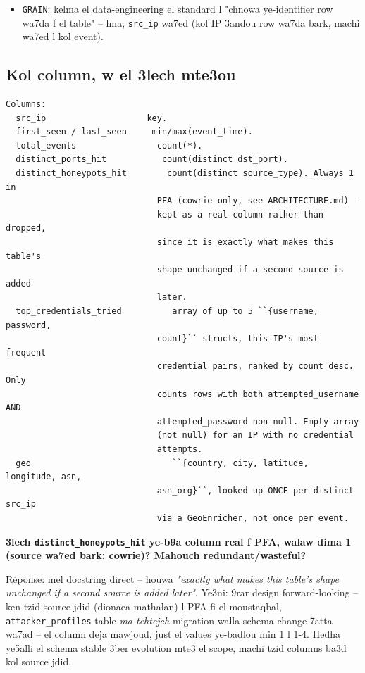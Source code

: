 \documentclass[11pt,a4paper]{report}
\DeclareRobustCommand{\code}[1]{\texttt{#1}}
\begin{document}
\begin{itemize}
  \item \code{GRAIN}: kelma el data-engineering el standard l "chnowa
        ye-identifier row wa7da f el table" -- hna, \code{src\_ip} wa7ed
        (kol IP 3andou row wa7da bark, machi wa7ed l kol event).
\end{itemize}

\subsection{Kol column, w el 3lech mte3ou}

\begin{lstlisting}[style=pystyle]
Columns:
  src_ip                    key.
  first_seen / last_seen     min/max(event_time).
  total_events                count(*).
  distinct_ports_hit           count(distinct dst_port).
  distinct_honeypots_hit        count(distinct source_type). Always 1 in
                              PFA (cowrie-only, see ARCHITECTURE.md) -
                              kept as a real column rather than dropped,
                              since it is exactly what makes this table's
                              shape unchanged if a second source is added
                              later.
  top_credentials_tried          array of up to 5 ``{username, password,
                              count}`` structs, this IP's most frequent
                              credential pairs, ranked by count desc. Only
                              counts rows with both attempted_username AND
                              attempted_password non-null. Empty array
                              (not null) for an IP with no credential
                              attempts.
  geo                            ``{country, city, latitude, longitude, asn,
                              asn_org}``, looked up ONCE per distinct src_ip
                              via a GeoEnricher, not once per event.
\end{lstlisting}

\begin{soual}
\textbf{3lech \code{distinct\_honeypots\_hit} ye-b9a column real f PFA,
walaw dima 1 (source wa7ed bark: cowrie)? Mahouch redundant/wasteful?}

Réponse: mel docstring direct -- houwa \emph{"exactly what makes this
table's shape unchanged if a second source is added later"}. Ye3ni:
9rar design forward-looking -- ken tzid source jdid (dionaea mathalan)
l PFA fi el moustaqbal, \code{attacker\_profiles} table \emph{ma-tehtejch}
migration walla schema change 7atta wa7ad -- el column deja mawjoud,
just el values ye-badlou min 1 l 1-4. Hedha ye5alli el schema stable
3ber evolution mte3 el scope, machi tzid columns ba3d kol source jdid.
\end{soual}
\end{document}
